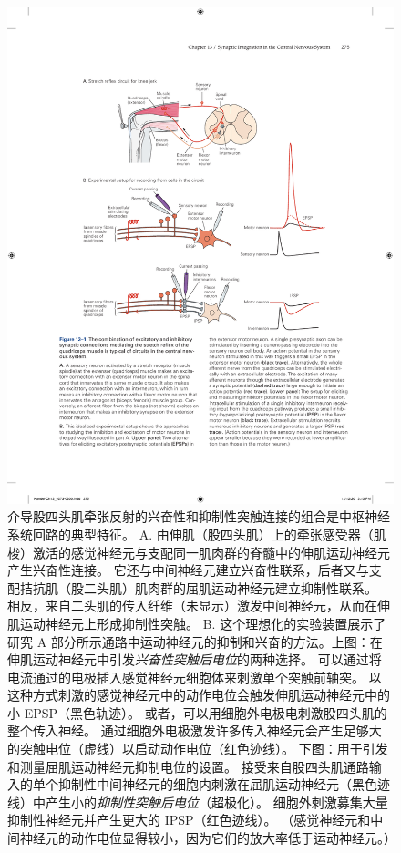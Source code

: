 \begin{figure}[htbp]
	\centering
	\includegraphics[width=0.8\linewidth]{chap13/fig_13_1}
	\caption{介导股四头肌牵张反射的兴奋性和抑制性突触连接的组合是中枢神经系统回路的典型特征。 A. 由伸肌（股四头肌）上的牵张感受器（肌梭）激活的感觉神经元与支配同一肌肉群的脊髓中的伸肌运动神经元产生兴奋性连接。 它还与中间神经元建立兴奋性联系，后者又与支配拮抗肌（股二头肌）肌肉群的屈肌运动神经元建立抑制性联系。 相反，来自二头肌的传入纤维（未显示）激发中间神经元，从而在伸肌运动神经元上形成抑制性突触。 B. 这个理想化的实验装置展示了研究 A 部分所示通路中运动神经元的抑制和兴奋的方法。上图：在伸肌运动神经元中引发\textit{兴奋性突触后电位}的两种选择。 可以通过将电流通过的电极插入感觉神经元细胞体来刺激单个突触前轴突。 以这种方式刺激的感觉神经元中的动作电位会触发伸肌运动神经元中的小 EPSP（黑色轨迹）。 或者，可以用细胞外电极电刺激股四头肌的整个传入神经。 通过细胞外电极激发许多传入神经元会产生足够大的突触电位（虚线）以启动动作电位（红色迹线）。 下图：用于引发和测量屈肌运动神经元抑制电位的设置。 接受来自股四头肌通路输入的单个抑制性中间神经元的细胞内刺激在屈肌运动神经元（黑色迹线）中产生小的\textit{抑制性突触后电位}（超极化）。 细胞外刺激募集大量抑制性神经元并产生更大的 IPSP（红色迹线）。 （感觉神经元和中间神经元的动作电位显得较小，因为它们的放大率低于运动神经元。）}
	\label{fig:13_1}
\end{figure}


